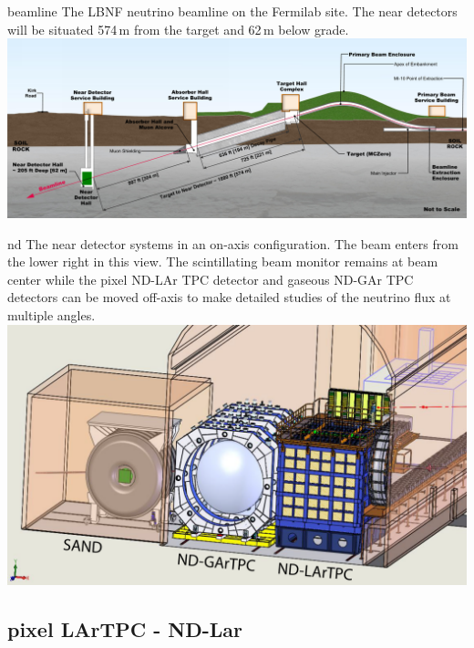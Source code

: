 \documentclass[../main-v1.tex]{subfiles}
\begin{document}
 \begin{dunefigure}
{beamline} %
{The LBNF neutrino beamline on the Fermilab site. The near detectors will be situated 574\,m from the target and 62\,m below grade.}
\includegraphics[height=0.3\textwidth]{graphics/IntroFigures/beamline-sideview.png}
\end{dunefigure}

 
 \begin{dunefigure}
{nd}
{The near detector systems in an on-axis configuration.  The beam enters from the lower right in this view. The  scintillating beam monitor remains at beam center while the pixel ND-LAr TPC detector and gaseous ND-GAr TPC detectors can be moved off-axis to make detailed studies of the neutrino flux at multiple angles.}
\includegraphics[height=0.5\textwidth]{graphics/IntroFigures/All3Detectors.pdf}
\end{dunefigure}

 \subsection{pixel LArTPC - ND-Lar }
 
\end{document}
